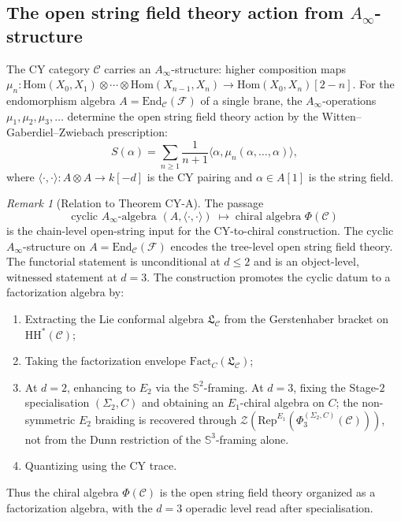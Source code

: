 \documentclass[11pt]{article}
\theoremstyle{definition}
\theoremstyle{remark}
\newtheorem{remark}[theorem]{Remark}
\newcommand{\Hom}{\mathrm{Hom}}
\newcommand{\End}{\mathrm{End}}
\newcommand{\HH}{\mathrm{HH}}
\newcommand{\Ainf}{A_\infty}
\newcommand{\Rep}{\mathrm{Rep}}
\newcommand{\Fact}{\mathrm{Fact}}
\newcommand{\cC}{\mathcal{C}}
\newcommand{\cF}{\mathcal{F}}
\newcommand{\cZ}{\mathcal{Z}}
\newcommand{\Eone}{E_1}
\newcommand{\Etwo}{E_2}
\begin{document}
\subsection{The open string field theory action from $\Ainf$-structure}
\label{sec:osft-action}

The CY category $\cC$ carries an $\Ainf$-structure: higher composition maps
$\mu_n \colon \Hom(X_0, X_1) \otimes \cdots \otimes \Hom(X_{n-1}, X_n)
\to \Hom(X_0, X_n)[2-n]$. For the endomorphism algebra $A = \End_\cC(\cF)$
of a single brane, the $\Ainf$-operations $\mu_1, \mu_2, \mu_3, \ldots$
determine the open string field theory action by the Witten--Gaberdiel--Zwiebach
prescription:
\[
 S(\alpha) = \sum_{n \geq 1} \frac{1}{n+1}
 \langle \alpha, \mu_n(\alpha, \ldots, \alpha) \rangle,
\]
where $\langle \cdot, \cdot \rangle \colon A \otimes A \to k[-d]$ is the CY
pairing and $\alpha \in A[1]$ is the string field.

\begin{remark}[Relation to Theorem CY-A]
\label{rem:osft-theorem-cya}
The passage
\[
 \text{cyclic } \Ainf\text{-algebra } (A, \langle \cdot, \cdot \rangle)
 \;\longmapsto\;
 \text{chiral algebra } \Phi(\cC)
\]
is the chain-level open-string input for the CY-to-chiral construction. The cyclic $\Ainf$-structure on $A = \End_\cC(\cF)$ encodes the tree-level open string field theory. The functorial statement is unconditional at $d\leq 2$ and is an object-level, witnessed statement at $d=3$. The construction promotes the cyclic datum to a factorization algebra by:
\begin{enumerate}[label=(\roman*)]
 \item Extracting the Lie conformal algebra $\mathfrak{L}_\cC$ from the
 Gerstenhaber bracket on $\HH^*(\cC)$;
 \item Taking the factorization envelope $\Fact_C(\mathfrak{L}_\cC)$;
 \item At $d=2$, enhancing to $\Etwo$ via the $\mathbb{S}^2$-framing. At $d=3$, fixing the Stage-$2$ specialisation $(\Sigma_2,C)$ and obtaining an $\Eone$-chiral algebra on $C$; the non-symmetric $\Etwo$ braiding is recovered through $\cZ(\Rep^{E_1}(\Phi_3^{(\Sigma_2,C)}(\cC)))$, not from the Dunn restriction of the $\mathbb{S}^3$-framing alone.
 \item Quantizing using the CY trace.
\end{enumerate}
Thus the chiral algebra $\Phi(\cC)$ is the open string field theory
organized as a factorization algebra, with the $d=3$ operadic level read after specialisation.
\end{remark}
\end{document}
